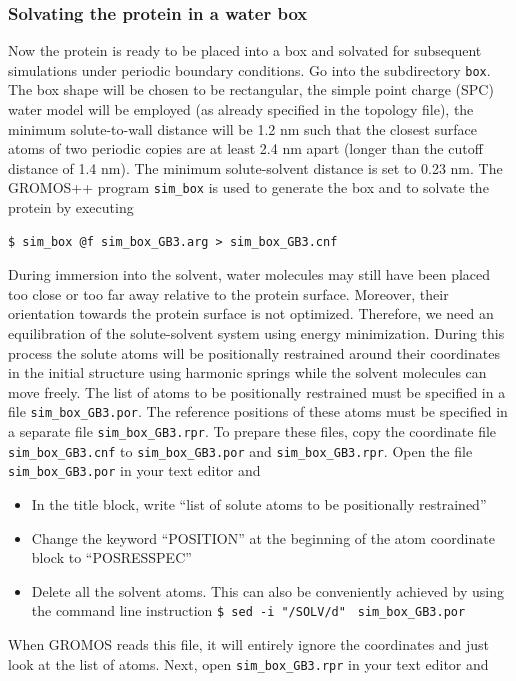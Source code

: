 \subsubsection{Solvating the protein in a water box}

Now the protein is ready to be placed into a box and solvated for subsequent simulations under periodic boundary conditions. Go into the subdirectory \texttt{box}. The box shape will be chosen to be rectangular, the simple point charge (SPC) water model \cite{Berendsen1981} will be employed (as already specified in the topology file), the minimum solute-to-wall distance will be 1.2 nm such that the closest surface atoms of two periodic copies are at least 2.4 nm apart (longer than the cutoff distance of 1.4 nm). The minimum solute-solvent distance is set to 0.23 nm. The GROMOS++ program \texttt{sim\_box} is used to generate the box and to solvate the protein by executing
\begin{lstlisting}
$ sim_box @f sim_box_GB3.arg > sim_box_GB3.cnf
\end{lstlisting}
During immersion into the solvent, water molecules may still have been placed too close or too far away relative to the protein surface. Moreover, their orientation towards the protein surface is not optimized. Therefore, we need an equilibration of the solute-solvent system using energy minimization. During this process the solute atoms will be positionally restrained around their coordinates in the initial structure using harmonic springs while the solvent molecules can move freely. The list of atoms to be positionally restrained must be specified in a file \texttt{sim\_box\_GB3.por}. The reference positions of these atoms must be specified in a separate file \texttt{sim\_box\_GB3.rpr}. To prepare these files, copy the coordinate file \texttt{sim\_box\_GB3.cnf} to \texttt{sim\_box\_GB3.por} and \texttt{sim\_box\_GB3.rpr}. Open the file \texttt{sim\_box\_GB3.por} in your text editor and
\begin{itemize}
\item	In the title block, write “list of solute atoms to be positionally restrained”
\item	Change the keyword “POSITION” at the beginning of the atom coordinate block to “POSRESSPEC”
\item	Delete all the solvent atoms. This can also be conveniently achieved by using the command line instruction \lstinline !$ sed -i "/SOLV/d"! \lstinline! sim_box_GB3.por!
\end{itemize}
When GROMOS reads this file, it will entirely ignore the coordinates and just look at the list of atoms. Next, open \texttt{sim\_box\_GB3.rpr} in your text editor and
